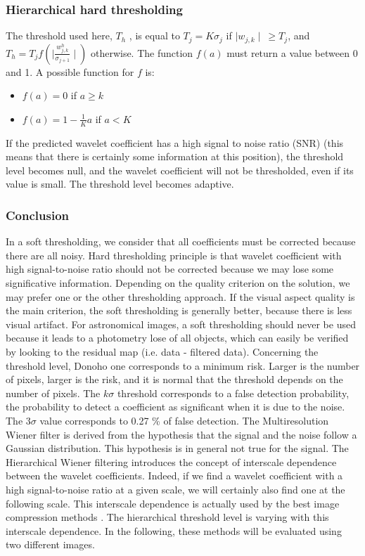 \subsubsection*{Hierarchical hard thresholding}

The threshold used here, $T_h$ \cite{starck:sta94_4}, is equal 
to $T_j=K \sigma_j$ if $\mid w_{j,k} \mid \ \geq T_j$,
and $T_h = T_j f(\mid\frac{w_{j,k}^h}{\sigma_{j+1}}\mid)$ otherwise. 
The function $f(a)$
must return a value between 0 and 1. A possible function for $f$ is:
\begin{itemize}
\item $f(a) = 0$ if $a \geq k$  
\item $f(a) = 1 - \frac{1}{K} a$ if $a < K$  
\end{itemize}
If the predicted wavelet coefficient has a high signal to noise ratio (SNR)
(this means that there is certainly some information at this position),
the threshold level becomes null, and the wavelet coefficient will not
be thresholded, even if its value is small. The threshold level becomes
adaptive.

\subsubsection*{Conclusion}
In a soft thresholding, we consider that all coefficients must be
corrected because there are all noisy. Hard thresholding principle is that
wavelet coefficient with high signal-to-noise ratio should not be 
corrected because we may lose some significative information. Depending
on the quality criterion on the solution, we may prefer one or the other
thresholding approach. If the visual aspect quality is the main criterion,  
the soft thresholding is generally better, because there is less 
visual artifact. For astronomical images, a soft thresholding should never
be used because it leads to a photometry lose of all objects, which 
can easily be verified by looking to the residual map 
(i.e. data - filtered data).
Concerning the threshold level, Donoho one corresponds to a minimum risk. 
Larger is the number of pixels, larger is the risk, and it is normal that the
threshold depends on the number of pixels. The $k\sigma$ threshold 
corresponds to a false detection probability, the probability to detect 
a coefficient as significant when it is due to the noise. The $3\sigma$ value
corresponds to 0.27 \% of false detection. The Multiresolution Wiener 
filter is derived from the hypothesis that the signal and the noise follow
a Gaussian distribution. This hypothesis is in general not true for the 
signal. The Hierarchical Wiener filtering introduces the concept of 
interscale dependence between the wavelet coefficients. Indeed,  
if we find a wavelet coefficient with a high signal-to-noise ratio
at a given scale, we will certainly also find one at the following scale.
This interscale dependence is actually used by the best image compression
methods \cite{compress:shapiro93,compress:said96}. The hierarchical threshold
level is varying with this interscale dependence. In the following, these
methods will be evaluated using two different images.
 
